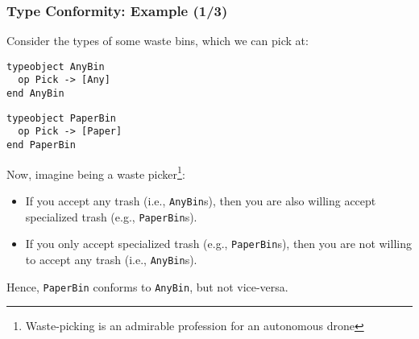 \begin{frame}[fragile]

\frametitle{Type Conformity: Example (1/3)}

Consider the types of some waste bins, which we can pick at:

\begin{center}
\begin{minipage}{0.4\textwidth}
\begin{lstlisting}
typeobject AnyBin
  op Pick -> [Any]
end AnyBin
\end{lstlisting}
\end{minipage}\quad%
\begin{minipage}{0.4\textwidth}
\begin{lstlisting}
typeobject PaperBin
  op Pick -> [Paper]
end PaperBin
\end{lstlisting}
\end{minipage}
\end{center}

Now, imagine being a waste picker\footnote{Waste-picking is an
admirable profession for an autonomous drone}:

\begin{itemize}

\item If you accept any trash (i.e., \texttt{AnyBin}s), then you are
also willing accept specialized trash (e.g., \texttt{PaperBin}s).

\item If you only accept specialized trash (e.g., \texttt{PaperBin}s),
then you are not willing to accept any trash (i.e., \texttt{AnyBin}s).

\end{itemize}

Hence, \texttt{PaperBin} conforms to \texttt{AnyBin}, but not
vice-versa.

\end{frame}


